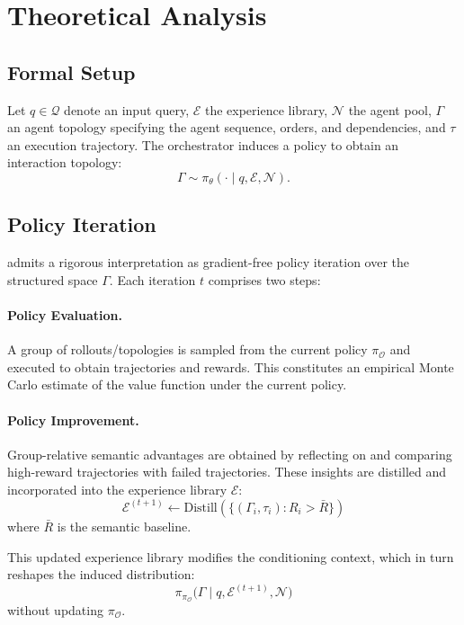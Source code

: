 \newpage

\appendix
\section{Theoretical Analysis}
\label{app:theory}
\subsection{Formal Setup}
Let $q \in \mathcal{Q}$ denote an input query, $\mathcal{E}$ the experience library, $\mathcal{N}$ the agent pool, $\Gamma$ an agent topology specifying the agent sequence, orders, and dependencies, and $\tau$ an execution trajectory. The orchestrator induces a policy to obtain an interaction topology:
\[
\Gamma \sim \pi_{\theta}(\cdot \mid q, \mathcal{E}, \mathcal{N}).
\]

\subsection{Policy Iteration}
\hero admits a rigorous interpretation as gradient-free policy iteration over the structured space $\Gamma$. Each iteration $t$ comprises two steps:

\paragraph{\textbf{Policy Evaluation.}}
A group of rollouts/topologies is sampled from the current policy $\pi_{\mathcal{O}}$ and executed to obtain trajectories and rewards. This constitutes an empirical Monte Carlo estimate of the value function under the current policy. 

\paragraph{\textbf{Policy Improvement.}}
Group-relative semantic advantages are obtained by reflecting on and comparing high-reward trajectories with failed trajectories. These insights are distilled and incorporated into the experience library $\mathcal{E}$:
\[
\mathcal{E}^(t+1) \gets \text{Distill}\left(\{(\Gamma_{i}, \tau_i) : R_i > \bar{R}\}\right)
\] where $\bar{R}$ is the semantic baseline. 

This updated experience library  modifies the conditioning context, which in turn reshapes the induced distribution: 
\[
\pi_{\pi_\mathcal{O}}\bigl(\Gamma \mid q, \mathcal{E}^{(t+1)}, \mathcal{N}\bigr)
\] without updating $\pi_\mathcal{O}$.

